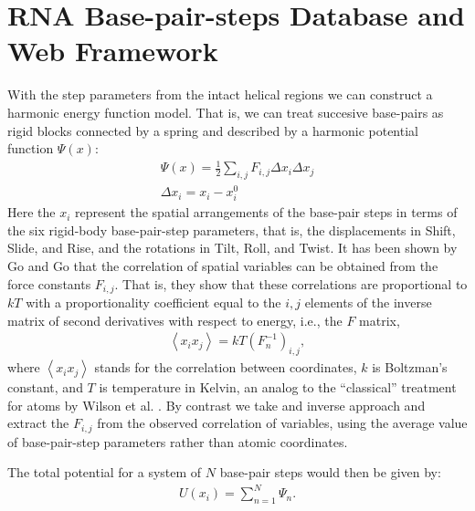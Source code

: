 
\section{RNA Base-pair-steps Database and Web Framework}
With the step parameters from the intact helical regions we can
construct  a harmonic  energy function  model. That  is, we  can treat
succesive  base-pairs  as  rigid  blocks  connected by  a  spring  and
described by a harmonic potential function $\Psi(x)$:
\begin{gather}
\Psi (x) = \frac{1}{2}\sum_{i,j} F_{i,j} \Delta x_{i} \Delta x_{j}\\
\Delta x_{i}=x_{i}-x_{i}^{0}
\end{gather} 
Here the  $x_{i}$ represent the spatial arrangements  of the base-pair
steps in  terms of the six rigid-body  base-pair-step parameters, that
is, the displacements in Shift,  Slide, and Rise, and the rotations in
Tilt, Roll,  and Twist. It has  been shown by Go  and Go \cite{go1976}
that the  correlation of  spatial variables can  be obtained  from the
force constants $F_{i,j}$. That  is, they show that these correlations
are proportional  to $kT$ with a proportionality  coefficient equal to
the $i,j$  elements of the  inverse matrix of second  derivatives with
respect to energy, i.e., the $F$ matrix,
\begin{gather}
\left<x_i x_j\right> = kT (F_{n}^{-1})_{i,j} ,
\end{gather} 
where  $\left< x_i  x_j \right>$  stands for  the  correlation between
coordinates,  $k$ is Boltzman's  constant, and  $T$ is  temperature in
Kelvin, an analog  to the ``classical'' treatment for  atoms by Wilson
et al.   \cite{wilson1955}. By contrast  we take and  inverse approach
and extract the $F_{i,j}$  from the observed correlation of variables,
using  the  average value  of  base-pair-step  parameters rather  than
atomic coordinates.

The total potential for a system  of $N$ base-pair steps would then be
given by:
\begin{gather}
U(x_{i}) = \sum_{n=1}^{N} \Psi_{n} .
\end{gather}


